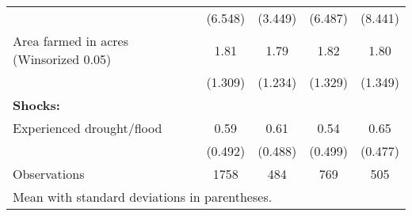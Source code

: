 {\begin{tabular}{l*{4}{c}}
                    &     (6.548)         &     (3.449)         &     (6.487)         &     (8.441)         \\
[1em]
Area farmed in acres (Winsorized 0.05)&        1.81         &        1.79         &        1.82         &        1.80         \\
                    &     (1.309)         &     (1.234)         &     (1.329)         &     (1.349)         \\
[1em]
\textbf{Shocks:}    &                     &                     &                     &                     \\
[1em]
Experienced drought/flood&        0.59         &        0.61         &        0.54         &        0.65         \\
                    &     (0.492)         &     (0.488)         &     (0.499)         &     (0.477)         \\
\hline
Observations        &        1758         &         484         &         769         &         505         \\
\hline\hline
\multicolumn{5}{l}{\footnotesize Mean with standard deviations in parentheses.}\\
\end{tabular}
}
